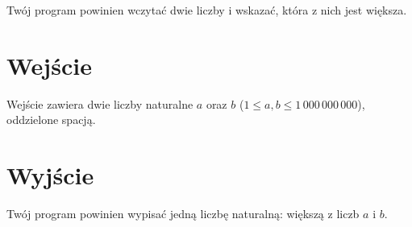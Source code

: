 \documentclass{spiral-kurs}
\begin{document}
\makeheader
%
    Twój program powinien wczytać dwie liczby i wskazać, która z nich jest większa.

    \section{Wejście}
    Wejście zawiera dwie liczby naturalne $a$ oraz $b$
    ($1 \le a, b \le 1\,000\,000\,000$), oddzielone spacją.
      
    \section{Wyjście}
    Twój program powinien wypisać jedną liczbę naturalną: większą z liczb $a$ i $b$.



  
\end{document}
